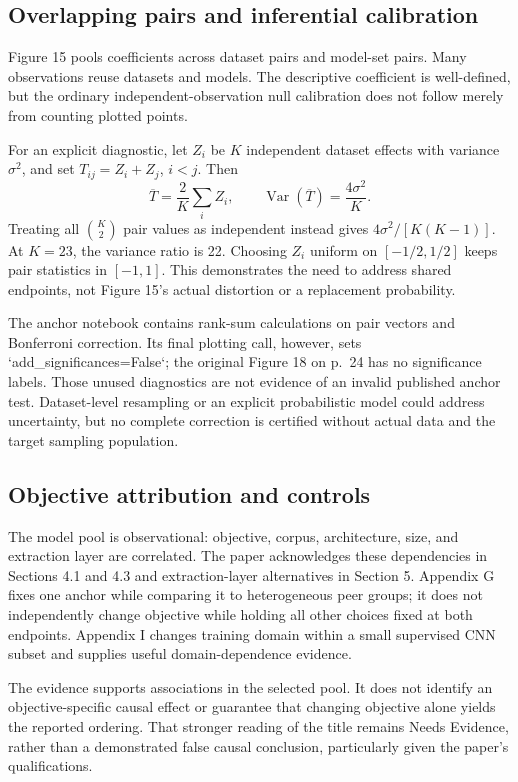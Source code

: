 \documentclass[10pt]{article}
\begin{document}
\subsection*{Overlapping pairs and inferential calibration}
Figure 15 pools coefficients across dataset pairs and model-set pairs. Many observations reuse datasets and models. The descriptive coefficient is well-defined, but the ordinary independent-observation null calibration does not follow merely from counting plotted points.\par
For an explicit diagnostic, let \(Z_i\) be \(K\) independent dataset effects with variance \(\sigma^2\), and set \(T_{ij}=Z_i+Z_j\), \(i<j\). Then \[\overline T=\frac2K\sum_i Z_i,\qquad
 \operatorname{Var}(\overline T)=\frac{4\sigma^2}{K}.\] Treating all \(\binom K2\) pair values as independent instead gives \(4\sigma^2/[K(K-1)]\). At \(K=23\), the variance ratio is 22. Choosing \(Z_i\) uniform on \([-1/2,1/2]\) keeps pair statistics in \([-1,1]\). This demonstrates the need to address shared endpoints, not Figure 15’s actual distortion or a replacement probability.\par
The anchor notebook contains rank-sum calculations on pair vectors and Bonferroni correction. Its final plotting call, however, sets `add\_significances=False`; the original Figure 18 on p. 24 has no significance labels. Those unused diagnostics are not evidence of an invalid published anchor test. Dataset-level resampling or an explicit probabilistic model could address uncertainty, but no complete correction is certified without actual data and the target sampling population.\par
\subsection*{Objective attribution and controls}
The model pool is observational: objective, corpus, architecture, size, and extraction layer are correlated. The paper acknowledges these dependencies in Sections 4.1 and 4.3 and extraction-layer alternatives in Section 5. Appendix G fixes one anchor while comparing it to heterogeneous peer groups; it does not independently change objective while holding all other choices fixed at both endpoints. Appendix I changes training domain within a small supervised CNN subset and supplies useful domain-dependence evidence.\par
The evidence supports associations in the selected pool. It does not identify an objective-specific causal effect or guarantee that changing objective alone yields the reported ordering. That stronger reading of the title remains Needs Evidence, rather than a demonstrated false causal conclusion, particularly given the paper’s qualifications.\par
\end{document}
